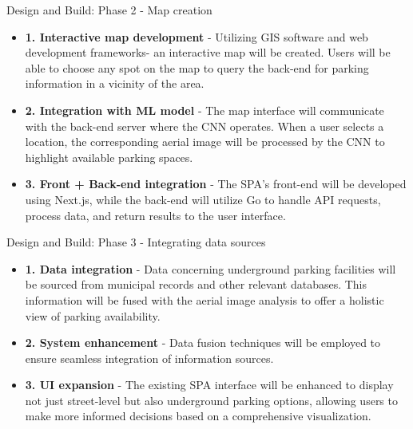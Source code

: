 \documentclass{beamer}
\begin{document}
\begin{frame}{Design and Build: Phase 2 - Map creation}
    \begin{itemize}
        \item{\textbf{1. Interactive map development} - } Utilizing GIS software and web development frameworks- an interactive map will be created. Users will be able to choose any spot on the map to query the back-end for parking information in a vicinity of the area.
        \item{\textbf{2. Integration with ML model} - } The map interface will communicate with the back-end server where the CNN operates. When a user selects a location, the corresponding aerial image will be processed by the CNN to highlight available parking spaces.
        \item{\textbf{3. Front + Back-end integration} - }The SPA’s front-end will be developed using Next.js, while the back-end will utilize Go to handle API requests, process data, and return results to the user interface.
    \end{itemize}
\end{frame}

\begin{frame}{Design and Build: Phase 3 - Integrating data sources}
    \begin{itemize}
        \item{\textbf{1. Data integration} - }Data concerning underground parking facilities will be sourced from municipal records and other relevant databases. This information will be fused with the aerial image analysis to offer a holistic view of parking availability.
        \item{\textbf{2. System enhancement} - }Data fusion techniques will be employed to ensure seamless integration of information sources.
        \item{\textbf{3. UI expansion} - }The existing SPA interface will be enhanced to display not just street-level but also underground parking options, allowing users to make more informed decisions based on a comprehensive visualization.
    \end{itemize}
\end{frame}
\end{document}
